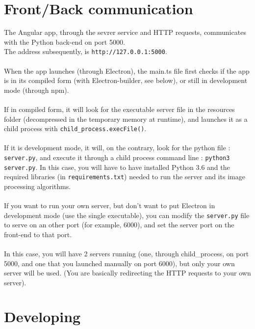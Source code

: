 \documentclass[12pt,a4paper]{article}
\begin{document}
\section{Front/Back communication}

The Angular app, through the sevrer service and HTTP requests, communicates with the Python back-end on port 5000.\\
The address subsequently, is \texttt{http://127.0.0.1:5000}.\\
~\\
When the app launches (through Electron), the main.ts file first checks if the app is in its compiled form (with Electron-builder, see below), or still in development mode (through npm).\\
~\\
If in compiled form, it will look for the executable server file in the resources folder (decompressed in the temporary memory at runtime), and launches it as a child process with \texttt{child\_process.execFile()}.\\
~\\
If it is development mode, it will, on the contrary, look for the python file : \texttt{server.py}, and execute it through a child process command line : \texttt{python3 server.py}. In this case, you will have to have installed Python 3.6 and the required libraries (in \texttt{requirements.txt}) needed to run the server and its image processing algorithms.\\
~\\
If you want to run your own server, but don't want to put Electron in development mode (use the single executable), you can modify the \texttt{server.py} file to serve on an other port (for example, 6000), and set the server port on the front-end to that port.\\
~\\
In this case, you will have 2 servers running (one, through child\_process, on port 5000, and one that you launched manually on port 6000), but only your own server will be used. (You are basically redirecting the HTTP requests to your own server).

\section{Developing}
\end{document}
